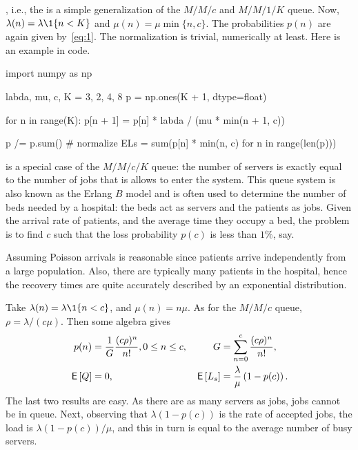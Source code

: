 , i.e.,  the  is a simple generalization of the $M/M/c$ and $M/M/1/K$ queue.
Now, $\lambda(n) = \lambda\1{n<K}$ and $\mu(n) = \mu \min\{n, c\}$.
The probabilities $p(n)$ are again given by~\cref{eq:1}.
The normalization is trivial, numerically at least.
Here is an example in code.
\begin{pyconsole}
import numpy as np

labda, mu, c, K = 3, 2, 4, 8
p = np.ones(K + 1, dtype=float)

for n in range(K):
    p[n + 1] = p[n] * labda / (mu * min(n + 1, c))

p /= p.sum()  # normalize
ELs = sum(p[n] * min(n, c) for n in range(len(p)))
\end{pyconsole}
 
 is a special case of the $M/M/c/K$ queue: the number of servers is exactly equal to the number of jobs that is allows to enter the system.
This queue system is also known as the Erlang $B$ model and is often used to determine the number of beds needed by a hospital: the beds act as servers and the patients as jobs.
Given the arrival rate of patients, and the average time they occupy a bed, the problem is to find $c$ such that the loss probability $p(c)$ is less than $1\%$, say.

Assuming Poisson arrivals is reasonable since patients arrive independently from a large population.
Also, there are typically many patients in the hospital, hence the recovery times are quite accurately described by an exponential distribution.

Take $\lambda(n) = \lambda\1{n<c}$, and $\mu(n) = n \mu$.
As for the $M/M/c$ queue, $\rho = \lambda/(c \mu)$.
Then some algebra gives
 \begin{align*}
   p(n) &= \frac 1 G \frac{(c\rho)^n}{n!}, 0\leq n \leq c, & 
   G&=\sum_{n=0}^{c} \frac{(c\rho)^n}{n!},\\
   \,\mathsf{E}\left[Q\right] &= 0, & 
\,\mathsf{E}\left[L_s\right] &= \frac{\lambda}{\mu} \left(1- p(c)\right).
 \end{align*}
 The last two results are easy.
 As there are as many servers as jobs, jobs cannot be in queue.
 Next, observing that $\lambda(1-p(c))$ is the rate of accepted jobs, the load is $\lambda(1-p(c))/\mu$, and this in turn is equal to the average number of busy servers.


